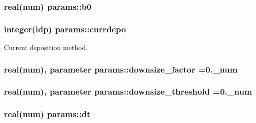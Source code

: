 \subsubsection[{\texorpdfstring{b0}{b0}}]{\setlength{\rightskip}{0pt plus 5cm}real(num) params\+::b0}\hypertarget{namespaceparams_a856909cec83e772b7266d146b4e70d7f}{}\label{namespaceparams_a856909cec83e772b7266d146b4e70d7f}
\subsubsection[{\texorpdfstring{currdepo}{currdepo}}]{\setlength{\rightskip}{0pt plus 5cm}integer(idp) params\+::currdepo}\hypertarget{namespaceparams_af4ccf29a8c1f3a8a47f08f5cbbcd30eb}{}\label{namespaceparams_af4ccf29a8c1f3a8a47f08f5cbbcd30eb}


Current deposition method. 

\subsubsection[{\texorpdfstring{downsize\+\_\+factor}{downsize_factor}}]{\setlength{\rightskip}{0pt plus 5cm}real(num), parameter params\+::downsize\+\_\+factor =0.\+\_\+num}\hypertarget{namespaceparams_a1e70b45a865ed6ef7927e0b49669a567}{}\label{namespaceparams_a1e70b45a865ed6ef7927e0b49669a567}
\subsubsection[{\texorpdfstring{downsize\+\_\+threshold}{downsize_threshold}}]{\setlength{\rightskip}{0pt plus 5cm}real(num), parameter params\+::downsize\+\_\+threshold =0.\+\_\+num}\hypertarget{namespaceparams_aa81c22d18e165451716c4b23ea6fbdb1}{}\label{namespaceparams_aa81c22d18e165451716c4b23ea6fbdb1}
\subsubsection[{\texorpdfstring{dt}{dt}}]{\setlength{\rightskip}{0pt plus 5cm}real(num) params\+::dt}\hypertarget{namespaceparams_aab5b9003ea4155de1cb7c0a3366e0b73}{}\label{namespaceparams_aab5b9003ea4155de1cb7c0a3366e0b73}
